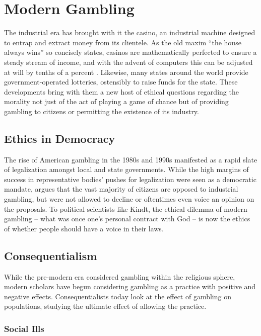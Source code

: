 \documentclass[american]{../../../coursework}
\begin{document}
\section{Modern Gambling}

The industrial era has brought with it the casino, an industrial machine designed to entrap and extract money from its clientele. As the old maxim ``the house always wins'' so concisely states, casinos are mathematically perfected to ensure a steady stream of income, and with the advent of computers this can be adjusted at will by tenths of a percent \parencite{Kin98}. Likewise, many states around the world provide government-operated lotteries, ostensibly to raise funds for the state. These developments bring with them a new host of ethical questions regarding the morality not just of the act of playing a game of chance but of providing gambling to citizens or permitting the existence of its industry.

\subsection{Ethics in Democracy}

The rise of American gambling in the 1980s and 1990s manifested as a rapid slate of legalization amongst local and state governments. While the high margins of success in representative bodies' pushes for legalization were seen as a democratic mandate, \textcite{Kin98} argues that the vast majority of citizens are opposed to industrial gambling, but were not allowed to decline or oftentimes even voice an opinion on the proposals. To political scientists like Kindt, the ethical dilemma of modern gambling -- what was once one's personal contract with God -- is now the ethics of whether people should have a voice in their laws.

\subsection{Consequentialism}

While the pre-modern era considered gambling within the religious sphere, modern scholars have begun considering gambling as a practice with positive and negative effects. Consequentialists today look at the effect of gambling on populations, studying the ultimate effect of allowing the practice.

\subsubsection{Social Ills}
\end{document}
